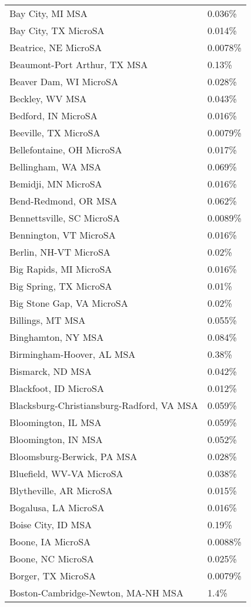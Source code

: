 \begin{longtable}[]{@{}ll@{}}
Bay City, MI MSA & 0.036\% \\
Bay City, TX MicroSA & 0.014\% \\
Beatrice, NE MicroSA & 0.0078\% \\
Beaumont-Port Arthur, TX MSA & 0.13\% \\
Beaver Dam, WI MicroSA & 0.028\% \\
Beckley, WV MSA & 0.043\% \\
Bedford, IN MicroSA & 0.016\% \\
Beeville, TX MicroSA & 0.0079\% \\
Bellefontaine, OH MicroSA & 0.017\% \\
Bellingham, WA MSA & 0.069\% \\
Bemidji, MN MicroSA & 0.016\% \\
Bend-Redmond, OR MSA & 0.062\% \\
Bennettsville, SC MicroSA & 0.0089\% \\
Bennington, VT MicroSA & 0.016\% \\
Berlin, NH-VT MicroSA & 0.02\% \\
Big Rapids, MI MicroSA & 0.016\% \\
Big Spring, TX MicroSA & 0.01\% \\
Big Stone Gap, VA MicroSA & 0.02\% \\
Billings, MT MSA & 0.055\% \\
Binghamton, NY MSA & 0.084\% \\
Birmingham-Hoover, AL MSA & 0.38\% \\
Bismarck, ND MSA & 0.042\% \\
Blackfoot, ID MicroSA & 0.012\% \\
Blacksburg-Christiansburg-Radford, VA MSA & 0.059\% \\
Bloomington, IL MSA & 0.059\% \\
Bloomington, IN MSA & 0.052\% \\
Bloomsburg-Berwick, PA MSA & 0.028\% \\
Bluefield, WV-VA MicroSA & 0.038\% \\
Blytheville, AR MicroSA & 0.015\% \\
Bogalusa, LA MicroSA & 0.016\% \\
Boise City, ID MSA & 0.19\% \\
Boone, IA MicroSA & 0.0088\% \\
Boone, NC MicroSA & 0.025\% \\
Borger, TX MicroSA & 0.0079\% \\
Boston-Cambridge-Newton, MA-NH MSA & 1.4\% \\

\end{longtable}
